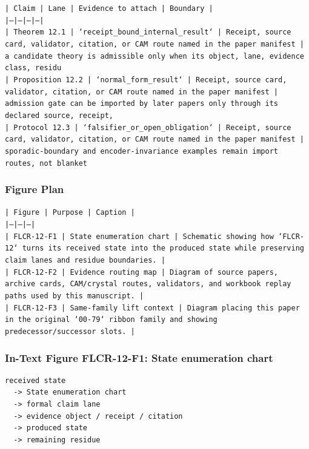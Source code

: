 \documentclass[11pt]{article}
\begin{document}
\noindent\texttt{| Claim | Lane | Evidence to attach | Boundary |}\\
\noindent\texttt{|---|---|---|---|}\\
\noindent\texttt{| Theorem 12.1 | `receipt\_bound\_internal\_result` | Receipt, source card, validator, citation, or CAM route named in the paper manifest | a candidate theory is admissible only when its object, lane, evidence class, residu}\\
\noindent\texttt{| Proposition 12.2 | `normal\_form\_result` | Receipt, source card, validator, citation, or CAM route named in the paper manifest | admission gate can be imported by later papers only through its declared source, receipt, }\\
\noindent\texttt{| Protocol 12.3 | `falsifier\_or\_open\_obligation` | Receipt, source card, validator, citation, or CAM route named in the paper manifest | sporadic-boundary and encoder-invariance examples remain import routes, not blanket}\\

\subsubsection*{Figure Plan}

\noindent\texttt{| Figure | Purpose | Caption |}\\
\noindent\texttt{|---|---|---|}\\
\noindent\texttt{| FLCR-12-F1 | State enumeration chart | Schematic showing how `FLCR-12` turns its received state into the produced state while preserving claim lanes and residue boundaries. |}\\
\noindent\texttt{| FLCR-12-F2 | Evidence routing map | Diagram of source papers, archive cards, CAM/crystal routes, validators, and workbook replay paths used by this manuscript. |}\\
\noindent\texttt{| FLCR-12-F3 | Same-family lift context | Diagram placing this paper in the original `00-79` ribbon family and showing predecessor/successor slots. |}\\

\subsubsection*{In-Text Figure FLCR-12-F1: State enumeration chart}

\begin{verbatim}
received state
  -> State enumeration chart
  -> formal claim lane
  -> evidence object / receipt / citation
  -> produced state
  -> remaining residue
\end{verbatim}
\end{document}
